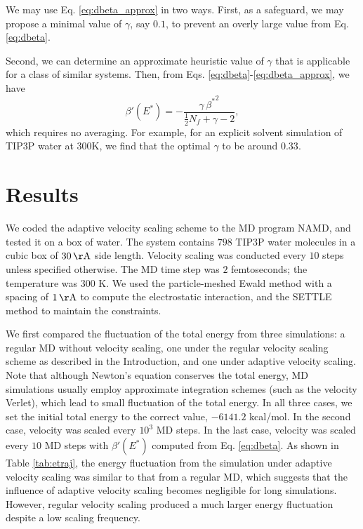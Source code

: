 \documentclass[reprint]{revtex4-1}
\begin{document}
We may use Eq. \eqref{eq:dbeta_approx} in two ways.
%
First, as a safeguard,
we may propose a minimal value of $\gamma$, say $0.1$,
to prevent an overly large value from Eq. \eqref{eq:dbeta}.

Second,
we can determine an approximate heuristic value of $\gamma$
that is applicable for a class of similar systems.
%
Then,
from Eqs. \eqref{eq:dbeta}-\eqref{eq:dbeta_approx},
we have
%
\begin{equation}
  \beta'(E^*)
  =
  -\frac{ \gamma \, {\beta^*}^2 }
  { \frac{1}{2} N_f + \gamma - 2 }
  ,
  \label{eq:dbeta_approx2}
\end{equation}
%
which requires no averaging.
%
For example,
for an explicit solvent simulation of TIP3P water\cite{jorgensen1983}
at 300K, we find that the optimal $\gamma$
to be around $0.33$.



\section{Results}



We coded the adaptive velocity scaling scheme to
the MD program NAMD\cite{NAMD},
and tested it on a box of water.
%
The system contains
$798$ TIP3P water molecules\cite{jorgensen1983}
in a cubic box of $30 \, \mathrm{\AA}$ side length.
%
Velocity scaling was conducted every $10$ steps
unless specified otherwise.
%
The MD time step was $2$ femtoseconds;
the temperature was $300$ K.
%
We used the particle-meshed Ewald method\cite{essmann1995}
with a spacing of $1 \, \mathrm{\AA}$
to compute the electrostatic interaction,
and the SETTLE method\cite{miyamoto1992}
to maintain the constraints.


We first compared the fluctuation of the total energy
from three simulations:
%
a regular MD without velocity scaling,
one under the regular velocity scaling scheme as described in the Introduction,
and one under adaptive velocity scaling.
%
Note that although Newton's equation conserves the total energy,
MD simulations usually employ approximate integration schemes
(such as the velocity Verlet),
which lead to small fluctuation of the total energy.
%
In all three cases,
we set the initial total energy to the correct value, $-6141.2$ kcal/mol.
%
In the second case,
velocity was scaled every $10^3$ MD steps.
%
In the last case,
velocity was scaled every $10$ MD steps with
$\beta'(E^*)$ computed from Eq. \eqref{eq:dbeta}.
%
As shown in Table \ref{tab:etraj},
the energy fluctuation from the simulation under adaptive velocity scaling
was similar to that from a regular MD,
which suggests that the influence of adaptive velocity scaling
becomes negligible for long simulations.
%
However, regular velocity scaling
produced a much larger energy fluctuation
despite a low scaling frequency.
\end{document}

